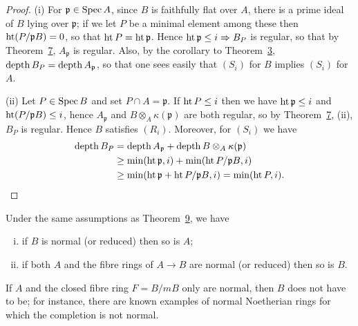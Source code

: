 \begin{proof}
(i) For $\mathfrak{p} \in \operatorname{Spec} A$, since $B$ is faithfully flat over $A$, there is a prime
ideal of $B$ lying over $\mathfrak{p}$; if we let $P$ be a minimal element among these then
$\operatorname{ht}(P/\mathfrak{p}B) = 0$, so that $\operatorname{ht} P = \operatorname{ht} \mathfrak{p}$. Hence
$\operatorname{ht} \mathfrak{p} \le i \Rightarrow B_P$ is regular, so that by
Theorem~\hyperref[thm:23.7]{7}, $A_{\mathfrak{p}}$ is regular. Also, by the corollary to
Theorem~\hyperref[thm:23.3]{3}, $\operatorname{depth} B_P = \operatorname{depth} A_{\mathfrak{p}}$, so that one sees easily that $(S_i)$ for
$B$ implies $(S_i)$ for $A$.

(ii) Let $P \in \operatorname{Spec} B$ and set $P \cap A = \mathfrak{p}$. If $\operatorname{ht} P \le i$ then we have
$\operatorname{ht} \mathfrak{p} \le i$ and $\operatorname{ht}(P/\mathfrak{p}B) \le i$, hence $A_{\mathfrak{p}}$ and
$B \otimes_A \kappa(\mathfrak{p})$ are both regular, so by Theorem~\hyperref[thm:23.7]{7}, (ii), $B_P$ is regular.
Hence $B$ satisfies $(R_i)$. Moreover, for $(S_i)$ we have
\begin{align*}
  \operatorname{depth} B_P &= \operatorname{depth} A_{\mathfrak{p}} + \operatorname{depth} B \otimes_A \kappa(\mathfrak{p}) \\
             &\ge \min(\operatorname{ht} \mathfrak{p}, i) + \min(\operatorname{ht} P/\mathfrak{p}B, i) \\
             &\ge \min(\operatorname{ht} \mathfrak{p} + \operatorname{ht} P/\mathfrak{p}B, i) = \min(\operatorname{ht} P, i).
\end{align*}
\end{proof}

\begin{corollary*}
Under the same assumptions as Theorem~\hyperref[thm:23.9]{9}, we have
\begin{enumerate}[(i)]
  \item if $B$ is normal (or reduced) then so is $A$;
  \item if both $A$ and the fibre rings of $A \to B$ are normal (or reduced) then
        so is $B$.
\end{enumerate}
\end{corollary*}

\begin{remark}
If $A$ and the closed fibre ring $F = B/mB$ only are normal, then $B$ does not
have to be; for instance, there are known examples of normal Noetherian rings
for which the completion is not normal.
\end{remark}

